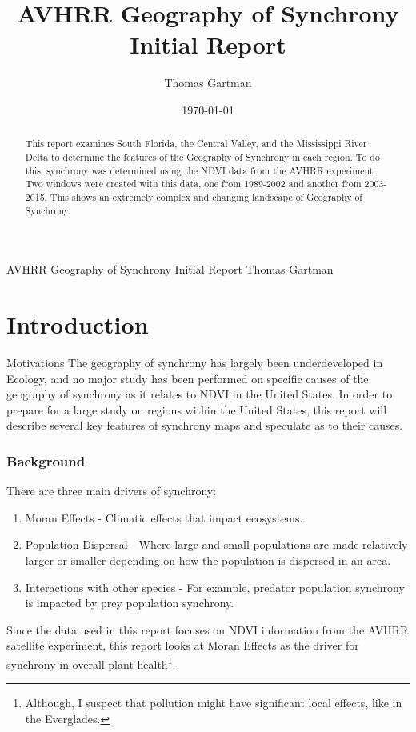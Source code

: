 \documentclass[11pt,reqno, twoside]{amsart}
\title{AVHRR Geography of Synchrony Initial Report}
\author{Thomas Gartman}
\date{\today}
\makeatletter
\renewcommand\subsection{\@startsection{subsection}{2}%
  \z@{-0.8\linespacing\@plus-0.7\linespacing}{0.7\linespacing}%
  {\normalfont\bfseries}}
\theoremstyle{plain}  %
\theoremstyle{definition}
\numberwithin{figure}{section}
\numberwithin{equation}{section}
\makeatother
\begin{document}
\maketitle
\markboth
{AVHRR Geography of Synchrony Initial Report}
{Thomas Gartman}

\begin{abstract}
   This report examines South Florida, the Central Valley, and the Mississippi River Delta to determine the features of the Geography of Synchrony in each region. To do this, synchrony was determined using the NDVI data from the AVHRR experiment. Two windows were created with this data, one from 1989-2002 and another from 2003-2015. This shows an extremely complex and changing landscape of Geography of Synchrony.
\end{abstract}

\tableofcontents
\newpage
\section{Introduction}
\subsection{Motivations}
The geography of synchrony has largely been underdeveloped in Ecology, and no major study has been performed on specific causes of the geography of synchrony as it relates to NDVI in the United States. In order to prepare for a large study on regions within the United States, this report will describe several key features of synchrony maps and speculate as to their causes.
\subsubsection{Background}
There are three main drivers of synchrony:
\begin{enumerate}
    \item Moran Effects - Climatic effects that impact ecosystems.
    \item Population Dispersal - Where large and small populations are made relatively larger or smaller depending on how the population is dispersed in an area. 
    \item Interactions with other species - For example, predator population synchrony is impacted by prey population synchrony.
\end{enumerate}
Since the data used in this report focuses on NDVI information from the AVHRR satellite experiment, this report looks at Moran Effects as the driver for synchrony in overall plant health\footnote{Although, I suspect that pollution might have significant local effects, like in the Everglades.}.  
\end{document}
